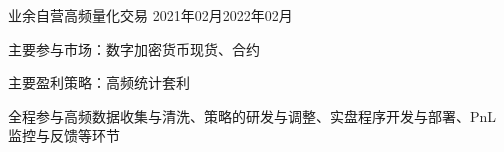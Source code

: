 
\begin{projitem}
    {业余自营高频量化交易}
    {}
    {2021年02月}{2022年02月}
    \item 主要参与市场：数字加密货币现货、合约
    \item 主要盈利策略：高频统计套利
    \item 全程参与高频数据收集与清洗、策略的研发与调整、实盘程序开发与部署、PnL 监控与反馈等环节
\end{projitem}



\endinput